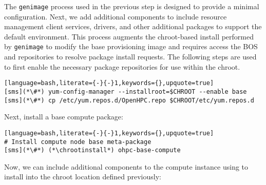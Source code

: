 
The \texttt{genimage} process used in the previous step is designed to provide a minimal \baseOS{} configuration. Next,
we add additional components to include resource management client services, \InfiniBand{} drivers, and other additional
packages to support the default \OHPC{} environment. This process augments the chroot-based install performed by
\texttt{genimage} to modify the base provisioning image and requires access the BOS and \OHPC{} repositories to resolve
package install requests. The following steps are used to first enable the necessary package repositories for use within
the chroot.

\begin{lstlisting}[language=bash,literate={-}{-}1,keywords={},upquote=true]
[sms](*\#*) yum-config-manager --installroot=$CHROOT --enable base
[sms](*\#*) cp /etc/yum.repos.d/OpenHPC.repo $CHROOT/etc/yum.repos.d
\end{lstlisting}

\noindent Next, install a base compute package:
\begin{lstlisting}[language=bash,literate={-}{-}1,keywords={},upquote=true]
# Install compute node base meta-package
[sms](*\#*) (*\chrootinstall*) ohpc-base-compute
\end{lstlisting}

\noindent Now, we can include additional components to the compute instance using
\texttt{\pkgmgr{}} to install into the chroot location defined previously:
